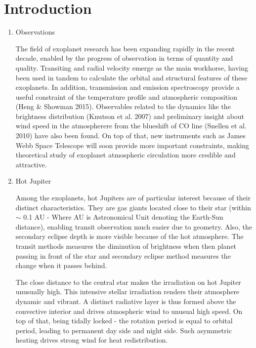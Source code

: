 \documentclass[11pt]{article}
\begin{document}
\section{Introduction}

\begin{enumerate}

\item Observations 

The field of exoplanet research has been expanding rapidly in the recent decade, enabled by the progress of observation in terms of quantity and quality. Transiting and radial velocity emerge as the main workhorse, having been used in tandem to calculate the orbital and structural features of these exoplanets. In addition, transmission and emission spectroscopy provide a useful constraint of the temperature profile and atmospheric composition (Heng \& Showman 2015). Observables related to the dynamics like the brightness distribution (Knutson et al. 2007) and preliminary insight about wind speed in the atmospherere from the blueshift of CO line (Snellen et al. 2010) have also been found. On top of that, new instruments such as James Webb Space Telescope will soon provide more important constraints, making theoretical study of exoplanet atmospheric circulation more credible and attractive. 

\item Hot Jupiter

Among the exoplanets, hot Jupiters are of particular interest because of their distinct characteristics. They are gas giants located close to their star (within $\sim$ 0.1 AU - Where AU is Astronomical Unit denoting the Earth-Sun distance), enabling transit observation much easier due to geometry. Also, the secondary eclipse depth is more visible because of the hot atmosphere.  The transit methods measures the diminution of brightness when then planet passing in front of the star and secondary eclipse method measures the change when it passes behind.

The close distance to the central star makes the irradiation on hot Jupiter unusually high. This intensive stellar irradiation renders their atmosphere dynamic and vibrant. A distinct radiative layer is thus formed above the convective interior and drives atmospheric wind to unusual high speed. On top of that, being tidally locked - the rotation period is equal to orbital period, leading to permanent day side and night side. Such asymmetric heating drives strong wind for heat redistribution. 


\end{enumerate}
\end{document}

